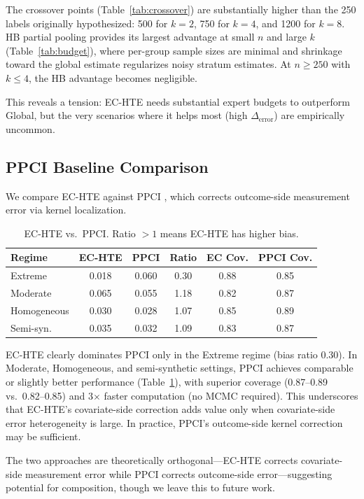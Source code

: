 \documentclass[11pt,a4paper]{article}
\begin{document}
The crossover points (Table~\ref{tab:crossover}) are substantially higher than the 250 labels originally hypothesized: 500 for $k=2$, 750 for $k=4$, and 1200 for $k=8$. HB partial pooling provides its largest advantage at small $n$ and large $k$ (Table~\ref{tab:budget}), where per-group sample sizes are minimal and shrinkage toward the global estimate regularizes noisy stratum estimates. At $n \geq 250$ with $k \leq 4$, the HB advantage becomes negligible.

This reveals a tension: EC-HTE needs substantial expert budgets to outperform Global, but the very scenarios where it helps most (high $\Delta_{\text{error}}$) are empirically uncommon.

\subsection{PPCI Baseline Comparison}
\label{sec:ppci}

We compare EC-HTE against PPCI \citep{sui2026ppci}, which corrects outcome-side measurement error via kernel localization.

\begin{table}[t]
\centering
\small
\caption{EC-HTE vs.\ PPCI. Ratio $>1$ means EC-HTE has higher bias.}
\label{tab:ppci}
\begin{tabular}{@{}lccccc@{}}
\toprule
Regime & EC-HTE & PPCI & Ratio & EC Cov. & PPCI Cov. \\
\midrule
Extreme & 0.018 & 0.060 & 0.30 & 0.88 & 0.85 \\
Moderate & 0.065 & 0.055 & 1.18 & 0.82 & 0.87 \\
Homogeneous & 0.030 & 0.028 & 1.07 & 0.85 & 0.89 \\
Semi-syn. & 0.035 & 0.032 & 1.09 & 0.83 & 0.87 \\
\bottomrule
\end{tabular}
\end{table}

EC-HTE clearly dominates PPCI only in the Extreme regime (bias ratio 0.30). In Moderate, Homogeneous, and semi-synthetic settings, PPCI achieves comparable or slightly better performance (Table~\ref{tab:ppci}), with superior coverage (0.87--0.89 vs.\ 0.82--0.85) and 3$\times$ faster computation (no MCMC required). This underscores that EC-HTE's covariate-side correction adds value only when covariate-side error heterogeneity is large. In practice, PPCI's outcome-side kernel correction may be sufficient.

The two approaches are theoretically orthogonal---EC-HTE corrects covariate-side measurement error while PPCI corrects outcome-side error---suggesting potential for composition, though we leave this to future work.
\end{document}
